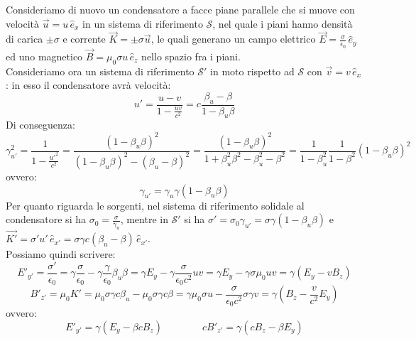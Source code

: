Consideriamo di nuovo un condensatore a facce piane parallele che si muove con velocità $ \vec{u} = u \,\hat{e}_x $ in un sistema di riferimento $ \mathcal{S} $, nel quale i piani hanno densità di carica $ \pm\sigma $ e corrente $ \vec{K} = \pm\sigma\vec{u} $, le quali generano un campo elettrico $ \vec{E} = \frac{\sigma}{\epsilon_0} \,\hat{e}_y $ ed uno magnetico $ \vec{B} = \mu_0 \sigma u\,\hat{e}_z $ nello spazio fra i piani. \\ 
%
Consideriamo ora un sistema di riferimento $ \mathcal{S}' $ in moto rispetto ad $ \mathcal{S} $ con $ \vec{v} = v \,\hat{e}_x $: in esso il condensatore avrà velocità:
\begin{equation}
	u' = \frac{u - v}{1 - \frac{uv}{c^2}} = c \frac{\beta_u - \beta}{1 - \beta_u\beta}
	\label{eq:39}
\end{equation}
Di conseguenza:
\begin{equation}
	\gamma_{u'}^2 = \frac{1}{1 - \frac{u'^2}{c^2}} = \frac{(1 - \beta_u\beta)^2}{(1-\beta_u\beta)^2 - (\beta_u-\beta)^2} = \frac{(1-\beta_u\beta)^2}{1 + \beta_u^2\beta^2-\beta_u^2-\beta^2} = \frac{1}{1-\beta_u^2}\frac{1}{1-\beta^2}(1-\beta_u\beta)^2
	\label{eq:40}
\end{equation}
ovvero:
\begin{equation}
	\gamma_{u'} = \gamma_u\gamma(1-\beta_u\beta)
	\label{eq:41}
\end{equation}
Per quanto riguarda le sorgenti, nel sistema di riferimento solidale al condensatore si ha $ \sigma_0 = \frac{\sigma}{\gamma_u} $, mentre in $ \mathcal{S}' $ si ha $ \sigma' = \sigma_0\gamma_{u'} = \sigma\gamma(1-\beta_u\beta) $ e $ \vec{K'} = \sigma'u'\,\hat{e}_{x'} = \sigma\gamma c(\beta_u-\beta)\,\hat{e}_{x'} $. \\ 
%
Possiamo quindi scrivere:
\begin{equation}
	E'_{y'} = \frac{\sigma'}{\epsilon_0} = \gamma \frac{\sigma}{\epsilon_0} - \gamma \frac{\gamma}{\epsilon_0}\beta_u\beta = \gamma E_y - \gamma \frac{\sigma}{\epsilon_0 c^2} uv = \gamma E_y - \gamma \sigma \mu_0 uv = \gamma (E_y - vB_z)
	\label{eq:42}
\end{equation}
\begin{equation}
	B'_{z'} = \mu_0 K' = \mu_0 \sigma \gamma c \beta_u - \mu_0 \sigma \gamma c \beta = \gamma \mu_0 \sigma u - \frac{\sigma}{\epsilon_0 c^2} \sigma \gamma v = \gamma (B_z - \frac{v}{c^2} E_y)
	\label{eq:43}
\end{equation}
ovvero:
\begin{equation}
	E'_{y'} = \gamma (E_y - \beta cB_z) \qquad\qquad cB'_{z'} = \gamma (cB_z - \beta E_y)
	\label{eq:44}
\end{equation}
